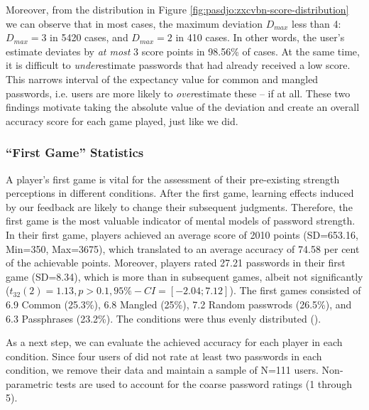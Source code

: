 Moreover, from the distribution in Figure \ref{fig:pasdjo:zxcvbn-score-distribution} we can observe that in most cases, the maximum deviation $D_{max}$ less than 4: $D_{max} = 3$ in 5420 cases, and $D_{max} = 2$ in 410 cases. In other words, the user's estimate deviates by \textit{at most} 3 score points in 98.56\% of cases. At the same time, it is difficult to \textit{under}estimate passwords that had already received a low score. This narrows interval of the expectancy value for common and mangled passwords, i.e. users are more likely to \textit{over}estimate these -- if at all. These two findings motivate taking the absolute value of the deviation and create an overall accuracy score for each game played, just like we did. 


\subsubsection{``First Game'' Statistics}
A player's first game is vital for the assessment of their pre-existing strength perceptions in different conditions. After the first game, learning effects induced by our feedback are likely to change their subsequent judgments. Therefore, the first game is the most valuable indicator of mental models of password strength. In their first game, players achieved an average score of 2010 points (SD=653.16, Min=350, Max=3675), which translated to an average accuracy of 74.58 per cent of the achievable points. Moreover, players rated 27.21 passwords in their first game (SD=8.34), which is more than in subsequent games, albeit not significantly ($t_{32}(2) = 1.13, p > 0.1, 95\%-CI = [-2.04;7.12]$).%
The first games consisted of 6.9 Common (25.3\%), 6.8 Mangled (25\%), 7.2 Random passwrods (26.5\%), and 6.3 Passphrases (23.2\%). The conditions were thus evenly distributed (). 

As a next step, we can evaluate the achieved accuracy for each player in each condition. Since four users of did not rate at least two passwords in each condition, we remove their data and maintain a sample of N=111 users. Non-parametric tests are used to account for the coarse password ratings (1 through 5). 


